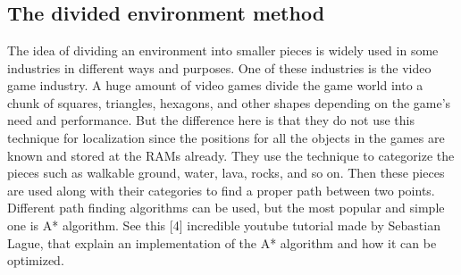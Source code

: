 \appendix %

\chapter{}
\section{The divided environment method}

The idea of dividing an environment into smaller pieces is widely used in
some industries in different ways and purposes. One of these industries is the video game industry. A huge amount of video games divide the game world
into a chunk of squares, triangles, hexagons, and other shapes depending on the
game’s need and performance. But the difference here is that they do not use
this technique for localization since the positions for all the objects in the games
are known and stored at the RAMs already. They use the technique to categorize
the pieces such as walkable ground, water, lava, rocks, and so on. Then these
pieces are used along with their categories to find a proper path between two
points. Different path finding algorithms can be used, but the most popular and
simple one is A* algorithm. See this [4] incredible youtube tutorial made by
Sebastian Lague, that explain an implementation of the A* algorithm and how
it can be optimized.